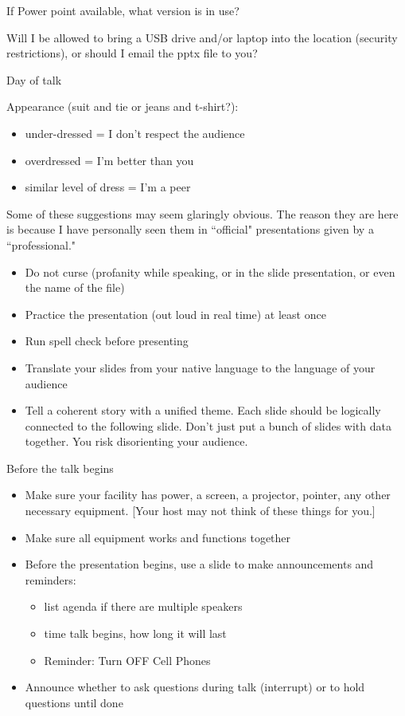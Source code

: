 If Power point available, what version is in use?

Will I be allowed to bring a USB drive and/or laptop into the location (security restrictions), or should I email the pptx file to you?

Day of talk

Appearance (suit and tie or jeans and t-shirt?):
\begin{itemize}
    \item under-dressed = I don't respect the audience
    \item overdressed = I'm better than you
    \item similar level of dress = I'm a peer
\end{itemize}
Some of these suggestions may seem glaringly obvious. The reason they are here is because I have personally seen them in ``official" presentations given by a ``professional."
\begin{itemize}
    \item Do not curse (profanity while speaking, or in the slide presentation, or even the name of the file)
    \item Practice the presentation (out loud in real time) at least once
    \item Run spell check before presenting
    \item Translate your slides from your native language to the language of your audience
    \item Tell a coherent story with a unified theme. Each slide should be logically connected to the following slide. Don't just put a bunch of slides with data together. You risk disorienting your audience.
\end{itemize}
Before the talk begins
\begin{itemize}
    \item Make sure your facility has power, a screen, a projector, pointer, any other necessary equipment. [Your host may not think of these things for you.]
    \item Make sure all equipment works and functions together
    \item Before the presentation begins, use a slide to make announcements and reminders:
\begin{itemize}
    \item list agenda if there are multiple speakers
    \item time talk begins, how long it will last
    \item Reminder: Turn OFF Cell Phones
\end{itemize}
    \item Announce whether to ask questions during talk (interrupt) or to hold questions until done
\end{itemize}
